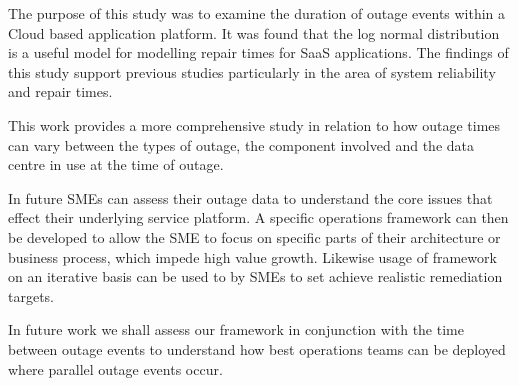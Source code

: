 \documentclass[conference]{IEEEtran}
\begin{document}
The purpose of this study was to examine the duration of outage events within a Cloud based application platform. It was found that the log normal distribution is a useful model for modelling repair times for SaaS applications. The findings of this study support previous studies particularly in the area of system reliability and repair times. \par

This work provides a more comprehensive study in relation to how outage times can vary between the types of outage, the component involved and the data centre in use at the time of outage. \par

In future SMEs can assess their outage data to understand the core issues that effect their underlying service platform. A specific operations framework can then be developed to allow the SME to focus on specific parts of their architecture or business process, which impede high value growth. Likewise usage of framework on an iterative basis can be used to by SMEs to set achieve realistic remediation targets. \par

In future work we shall assess our framework in conjunction with the time between outage events to understand how best operations teams can be deployed where parallel outage events occur.  \par

%
%

\end{document}
